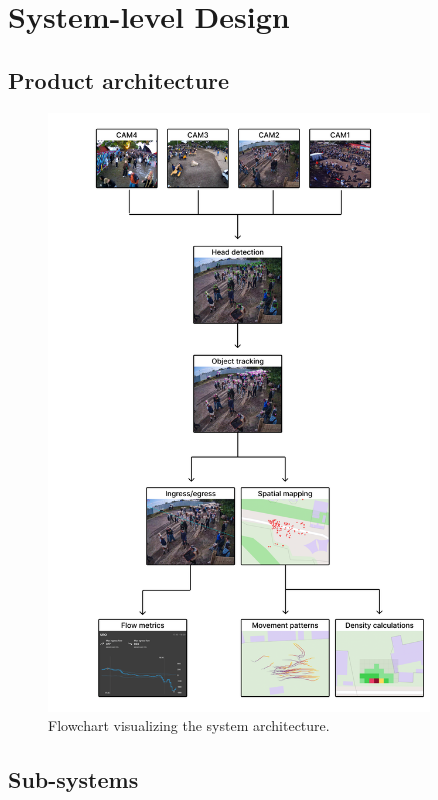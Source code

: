 \chapter{System-level Design}
\label{chap:system-level-design}

\section{Product architecture}

\begin{figure}
  \centering
  \includegraphics[width=0.9\textwidth]{Pictures/Figures/system_flowchart.png}
  \caption{Flowchart visualizing the system architecture.}
\end{figure}


\section{Sub-systems}


